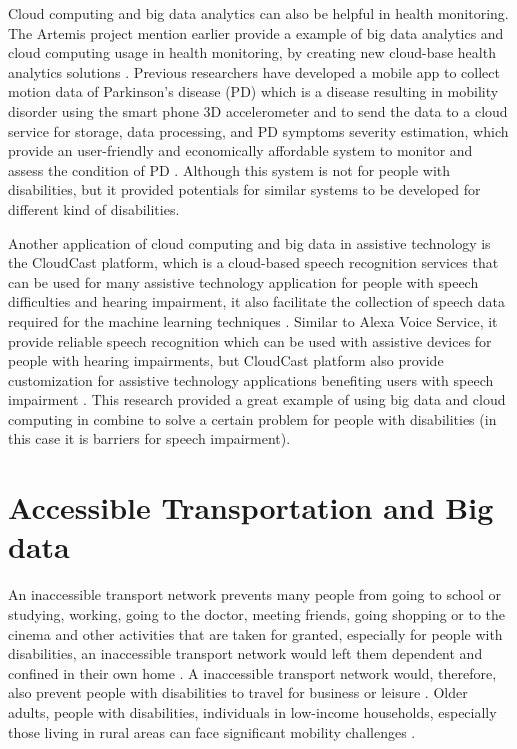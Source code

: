 Cloud computing and big data analytics can also be helpful in health monitoring. The Artemis project mention earlier
provide a example of big data analytics and cloud computing usage in health monitoring, by creating new cloud-base
health analytics solutions \cite{Khazaei14}. Previous researchers have developed a mobile app to collect motion 
data of Parkinson's disease (PD) which is a disease resulting in mobility disorder using the smart phone 3D 
accelerometer and to send the data to a cloud service for storage, data processing, and PD symptoms severity
estimation, which provide an user-friendly and economically affordable system to monitor and assess the condition
of PD \cite{info:doi/10.2196/mhealth.3956}. Although this system is not for people with disabilities, but it 
provided potentials for similar systems to be developed for different kind of disabilities. 

Another application of cloud computing and big data in assistive technology is the CloudCast platform, which is a 
cloud-based speech recognition services that can be used for many assistive technology application for people
with speech difficulties and hearing impairment, it also facilitate the collection of speech data required for
the machine learning techniques \cite{cunningham2017cloud}. Similar to Alexa Voice Service, it provide reliable 
speech recognition which can be used with assistive devices for people with hearing impairments, but CloudCast
platform also provide customization for assistive technology applications benefiting users with speech 
impairment \cite{cunningham2017cloud}. This research provided a great example of using big data and cloud 
computing in combine to solve a certain problem for people with disabilities (in this case it is barriers for speech impairment). 

\section{Accessible Transportation and Big data}

An inaccessible transport network prevents many people from going to school or studying, working, going
to the doctor, meeting friends, going shopping or to the cinema and other activities that
are taken for granted, especially for people with disabilities, an inaccessible transport
network would left them dependent and confined in their own home \cite{Ama}. A
inaccessible transport network would, therefore, also prevent people with disabilities to
travel for business or leisure \cite{milo}.
Older adults, people with disabilities, individuals in low-income households, especially 
those living in rural areas can face significant mobility challenges \cite{Farm}. 

